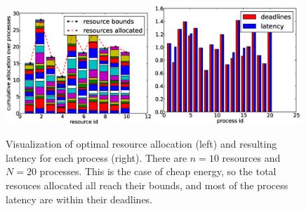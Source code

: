\begin{figure}[th]
\centering
\includegraphics[width=0.49\textwidth]{figures/test_resource_c.eps}
\includegraphics[width=0.49\textwidth]{figures/test_latency_c.eps}
\caption{Visualization of optimal resource allocation (left) and 
    resulting latency for each process (right).
    There are $n=10$ resources and $N=20$ processes.
    This is the case of cheap energy, so the total resouces allocated
    all reach their bounds, and most of the process latency are 
within their deadlines.}
\label{fig:allocation-c}
\end{figure}

